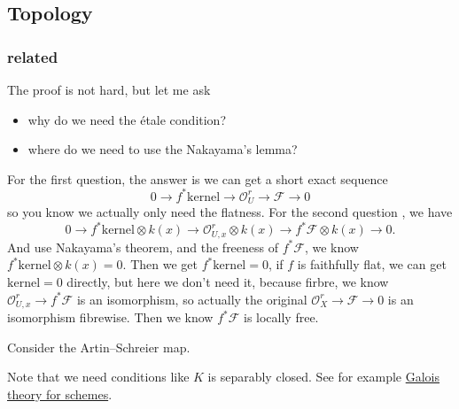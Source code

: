 \documentclass[../main.tex]{subfiles}
\begin{document}
\subsection{Topology}
\subsubsection{\Etale related}
\begin{example}[\'{E}tale fundamental group of the nodal curve $y^{2}=x^{2}(x+1)$]
\end{example}



\begin{example}
The proof is not hard, but let me ask 
\begin{itemize}
\item why do we need the \'{e}tale condition?
\item where do we need to use the Nakayama's lemma?
\end{itemize}
For the first question, the answer is we can get a short exact sequence 
$$0\rightarrow f^{*}\mathrm{kernel}\rightarrow \mathcal{O}_{U}^{r}\rightarrow \mathscr{F}\rightarrow 0$$
so you know we actually only need the flatness. For the second question , we have
$$0\rightarrow f^{*}\mathrm{kernel} \otimes k(x)\rightarrow \mathcal{O}_{U,x}^{r}\otimes k(x)\rightarrow f^{*}\mathscr{F}\otimes k(x)\rightarrow 0.$$
And use Nakayama's theorem, and the freeness of $f^{*}\mathscr{F}$, we know $f^{*}\mathrm{kernel} \otimes k(x)=0$. Then we get $f^{*}\mathrm{kernel} =0$, if $f$ is faithfully flat, we can get $\mathrm{kernel}=0$ directly, but here we don't need it, because firbre, we know $\mathcal{O}_{U,x}^{r}\rightarrow f^{*}\mathscr{F}$ is an isomorphism, so actually the original $\mathcal{O}_{X}^{r}\rightarrow \mathscr{F}\rightarrow 0$ is an isomorphism fibrewise. Then we know $f^{*}\mathscr{F}$ is locally free.
\end{example}



\begin{example} Consider the Artin–Schreier map.
\end{example}
\begin{remark}
Note that we need conditions like $K$ is separably closed. See for example \href{http://websites.math.leidenuniv.nl/algebra/GSchemes.pdf}{Galois theory for schemes}.
\end{remark}
\end{document}
